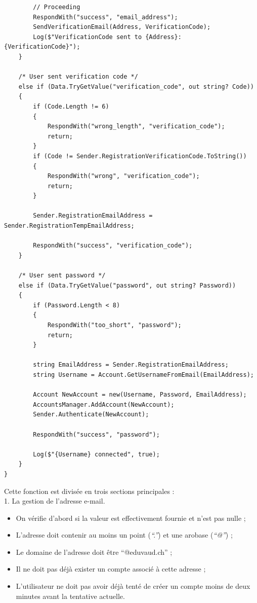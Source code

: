 \documentclass[12pt]{report}
\begin{document}
\begin{verbatim}
		// Proceeding
		RespondWith("success", "email_address");
		SendVerificationEmail(Address, VerificationCode);
		Log($"VerificationCode sent to {Address}: {VerificationCode}");
	}
	
	/* User sent verification code */
	else if (Data.TryGetValue("verification_code", out string? Code))
	{
		if (Code.Length != 6)
		{
			RespondWith("wrong_length", "verification_code");
			return;
		}
		if (Code != Sender.RegistrationVerificationCode.ToString())
		{
			RespondWith("wrong", "verification_code");
			return;
		}
		
		Sender.RegistrationEmailAddress = Sender.RegistrationTempEmailAddress;
		
		RespondWith("success", "verification_code");
	}
	
	/* User sent password */
	else if (Data.TryGetValue("password", out string? Password))
	{
		if (Password.Length < 8)
		{
			RespondWith("too_short", "password");
			return;
		}
		
		string EmailAddress = Sender.RegistrationEmailAddress;
		string Username = Account.GetUsernameFromEmail(EmailAddress);
		
		Account NewAccount = new(Username, Password, EmailAddress);
		AccountsManager.AddAccount(NewAccount);
		Sender.Authenticate(NewAccount);
		
		RespondWith("success", "password");
		
		Log($"{Username} connected", true);
	}
}
	\end{verbatim}
	
	Cette fonction est divisée en trois sections principales :
	\\
	
	1. La gestion de l’adresse e-mail.
	
	\begin{itemize}
		\item On vérifie d'abord si la valeur est effectivement fournie et n'est pas nulle ;
		\item L’adresse doit contenir au moins un point (\textit{“.”}) et une arobase (\textit{“@”}) ;
		\item Le domaine de l’adresse doit être “@eduvaud.ch” ;
		\item Il ne doit pas déjà exister un compte associé à cette adresse ;
		\item L’utilisateur ne doit pas avoir déjà tenté de créer un compte moins de deux minutes avant la tentative actuelle.
	\end{itemize}
	
\end{document}
